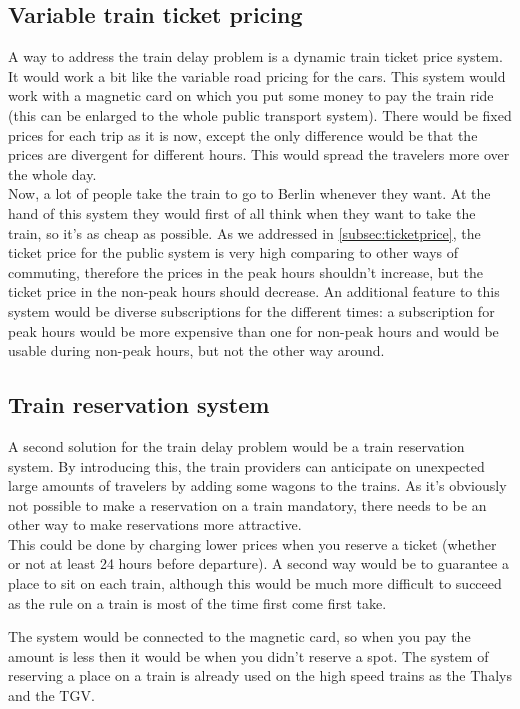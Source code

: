 \subsection{Variable train ticket pricing} \label{subsec:ticketPriceSolution}
A way to address the train delay problem is a dynamic train ticket price system. It would work a bit like the variable road pricing for the cars. This system would work with a magnetic card on which you put some money to pay the train ride (this can be enlarged to the whole public transport system). There would be fixed prices for each trip as it is now, except the only difference would be that the prices are divergent for different hours. This would spread the travelers more over the whole day. \\ \newline
 Now, a lot of people take the train to go to Berlin whenever they want. At the hand of this system they would first of all think when they want to take the train, so it's as cheap as possible. As we addressed in \ref{subsec:ticketprice}, the ticket price for the public system is very high comparing to other ways of commuting, therefore the prices in the peak hours shouldn't increase, but the ticket price in the non-peak hours should decrease. An additional feature to this system would be diverse subscriptions for the different times: a subscription for peak hours would be more expensive than one for non-peak hours and would be usable during non-peak hours, but not the other way around. 
 
\subsection{Train reservation system}\label{subsec:resSys}
A second solution for the train delay problem would be a train reservation system. By introducing this, the train providers can anticipate on unexpected large amounts of travelers by adding some wagons to the trains. As it's obviously not possible to make a reservation on a train mandatory, there needs to be an other way to make reservations more attractive. \\ \newline
This could be done by charging lower prices when you reserve a ticket (whether or not at least 24 hours before departure). A second way would be to guarantee a place to sit on each train, although this would be much more difficult to succeed as the rule on a train is most of the time first come first take. 

The system would be connected to the magnetic card, so when you pay the amount is less then it would be when you didn't reserve a spot. The system of reserving a place on a train is already used on the high speed trains as the Thalys and the TGV.  

